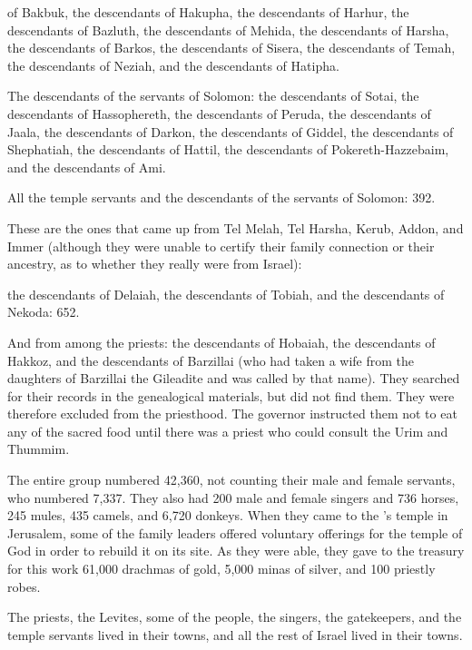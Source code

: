 {of Bakbuk,
the descendants
of Hakupha,
the descendants
of Harhur,
the descendants
of Bazluth,
the descendants
of Mehida,
the descendants
of Harsha,
the descendants
of Barkos,
the descendants of
Sisera,
the descendants
of Temah,
the descendants
of Neziah,
and the descendants
of Hatipha.
\par }{\PP {}The descendants
of the servants
of Solomon: the descendants
of
Sotai,
the descendants
of Hassophereth,
the descendants
of Peruda,
the descendants
of Jaala,
the descendants of
Darkon,
the descendants
of Giddel,
the descendants
of Shephatiah,
the descendants of
Hattil,
the descendants of
Pokereth-Hazzebaim,
and the descendants
of Ami.
\par }{\PP {}All
the temple servants
and the descendants
of the servants
of Solomon: 392.
\par }{\PP {}These
are the ones that came up
from Tel Melah,
Tel Harsha,
Kerub,
Addon,
and Immer
(although they were unable
to certify
their family
connection
or
their ancestry,
as to whether
they
really were from Israel):
\par }{\PP {}the descendants
of Delaiah,
the descendants
of Tobiah,
and the descendants
of Nekoda: 652.
\par }{\PP {}And from among the priests: the descendants
of Hobaiah,
the descendants of
Hakkoz,
and the descendants of
Barzillai
(who had
taken
a wife
from the daughters
of Barzillai
the Gileadite
and was called
by that name).
They
searched
for their records
in the genealogical materials,
but did not
find
them. They were therefore excluded
from
the priesthood.
The governor
instructed
them not
to eat
any of the sacred
food until
there
was a priest
who could consult
the Urim
and Thummim.
\par }{\PP {}The entire group
numbered 42,360,
not counting
their male and female
servants,
who numbered 7,337.
They also had 200
male and female singers
and 736
horses,
245
mules,
435
camels,
and 6,720
donkeys.
When they came
to the
{}’s
temple
in Jerusalem,
some of the family
leaders
offered voluntary offerings
for the temple
of God
in order to rebuild
it on
its site.
As they were able,
they gave
to the treasury
for this work
61,000
drachmas
of gold,
5,000
minas
of silver,
and 100
priestly
robes.
\par }{\PP {}The priests,
the Levites,
some
of the people,
the singers,
the gatekeepers,
and the temple servants
lived
in their towns,
and all
the rest of Israel
lived in
their towns.


}
